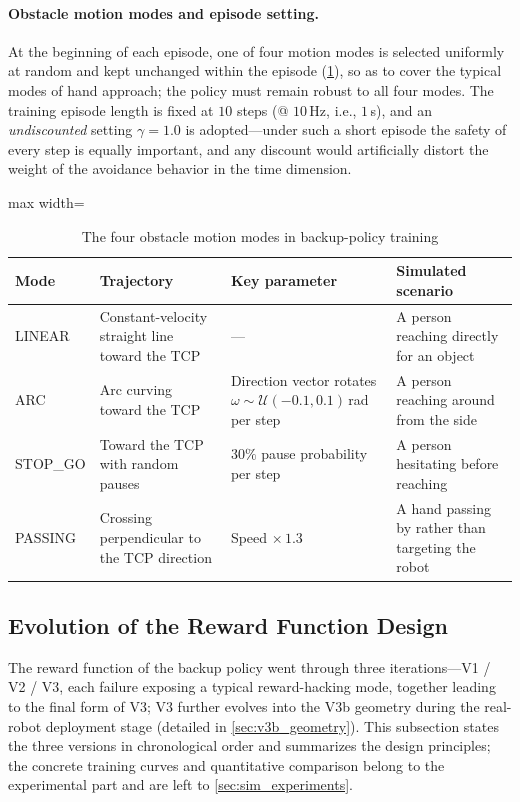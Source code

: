 \paragraph{Obstacle motion modes and episode setting.} At the beginning of each episode, one of four motion modes is selected uniformly at random and kept unchanged within the episode (\cref{tab:motion_modes}), so as to cover the typical modes of hand approach; the policy must remain robust to all four modes. The training episode length is fixed at $10$ steps (@ $10$\,Hz, i.e., $1$\,s), and an \emph{undiscounted} setting $\gamma = 1.0$ is adopted---under such a short episode the safety of every step is equally important, and any discount would artificially distort the weight of the avoidance behavior in the time dimension.

\begin{table}[htbp]
  \centering
  \caption{The four obstacle motion modes in backup-policy training}
  \label{tab:motion_modes}
  \footnotesize
  \begin{adjustbox}{max width=\textwidth}
  \begin{tabular}{@{}llll@{}}
    \toprule
    Mode & Trajectory & Key parameter & Simulated scenario \\
    \midrule
    LINEAR   & Constant-velocity straight line toward the TCP & --- & A person reaching directly for an object \\
    ARC      & Arc curving toward the TCP & Direction vector rotates $\omega \sim \mathcal{U}(-0.1, 0.1)$\,rad per step & A person reaching around from the side \\
    STOP\_GO & Toward the TCP with random pauses & $30\%$ pause probability per step & A person hesitating before reaching \\
    PASSING  & Crossing perpendicular to the TCP direction & Speed $\times\, 1.3$ & A hand passing by rather than targeting the robot \\
    \bottomrule
  \end{tabular}
  \end{adjustbox}
\end{table}

\subsection{Evolution of the Reward Function Design}\label{sec:backup_reward}

The reward function of the backup policy went through three iterations---V1 / V2 / V3, each failure exposing a typical reward-hacking mode, together leading to the final form of V3; V3 further evolves into the V3b geometry during the real-robot deployment stage (detailed in \cref{sec:v3b_geometry}). This subsection states the three versions in chronological order and summarizes the design principles; the concrete training curves and quantitative comparison belong to the experimental part and are left to \cref{sec:sim_experiments}.

